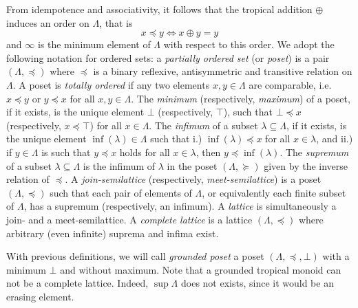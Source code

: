 \documentclass[11pt,british,reqno]{article}
\numberwithin{equation}{section}
\numberwithin{figure}{section}
\numberwithin{table}{section}
\theoremstyle{definition}
\theoremstyle{definition}
\theoremstyle{plain}
\theoremstyle{plain}
\theoremstyle{remark}
\theoremstyle{plain}
\numberwithin{equation}{section}
\numberwithin{figure}{section}
\numberwithin{table}{section}
\theoremstyle{plain}
\begin{document}
From idempotence and associativity, it follows that the tropical addition
$\oplus$ induces an order on $\Lambda$, that is 
\begin{equation}
x\preceq y\Leftrightarrow x\oplus y=y\label{eq: order induced by tropical addition}
\end{equation}
and $\infty$ is the minimum element of $\Lambda$ with respect
to this order. We adopt the following notation for ordered sets: a \textit{partially ordered set} (or \textit{poset}) is a pair $(\Lambda,\preceq)$
where $\preceq$ is a binary reflexive, antisymmetric and transitive
relation on $\Lambda$. A poset is \textit{totally ordered} if any two elements $x,y\in\Lambda$ are comparable, i.e. $x\preceq y$ or $y\preceq x$ for all $x,y\in\Lambda$. The \textit{minimum} (respectively, \textit{maximum}) of a poset,
if it exists, is the unique element $\bot$ (respectively, $\top$),
such that $\bot\preceq x$ (respectively, $x\preceq\top$) for all
$x\in\Lambda$. The \textit{infimum} of a subset $\lambda\subseteq\Lambda$, if it
exists, is the unique element $\inf(\lambda)\in\Lambda$ such that
i.) $\inf(\lambda)\preceq x$ for all $x\in\lambda$, and ii.) if
$y\in\Lambda$ is such that $y\preceq x$ holds for all $x\in\lambda$,
then $y\preceq\inf(\lambda)$. The \textit{supremum} of a subset $\lambda\subseteq\Lambda$
is the infimum of $\lambda$ in the poset $(\Lambda,\succeq)$ given by the inverse
relation of $\preceq$. A \textit{join-semilattice} (respectively, \textit{meet-semilattice}) is a poset $(\Lambda,\preceq)$ such that each pair of elements of
$\Lambda$, or equivalently each finite subset of $\Lambda$, has
a supremum (respectively, an infimum). A \textit{lattice} is simultaneously
a join- and a meet-semilattice. A \textit{complete lattice} is a lattice $(\Lambda,\preceq)$ where arbitrary (even infinite) suprema and infima exist. 

With previous definitions, we will call \textit{grounded poset} a
poset $(\Lambda,\preceq,\bot)$ with a minimum $\bot$ and without
maximum. Note that a grounded tropical monoid can not be a complete lattice.
Indeed, $\displaystyle \sup\Lambda$ does not exists, since it
would be an erasing element.
\end{document}
